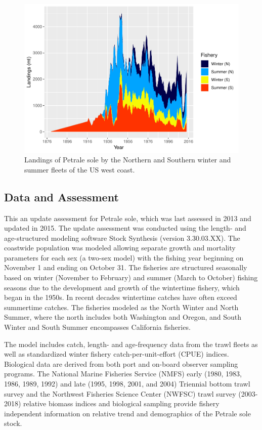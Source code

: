 \documentclass[12pt,]{article}
\begin{document}
\FloatBarrier

\begin{figure}
\centering
\includegraphics{Petrale_2019_Update_files/figure-latex/unnamed-chunk-13-1.pdf}
\caption{Landings of Petrale sole by the Northern and Southern winter
and summer fleets of the US west coast. \label{fig:Exec_catch1}}
\end{figure}

\FloatBarrier

\subsection*{Data and Assessment}\label{data-and-assessment}

This an update assessment for Petrale sole, which was last assessed in
2013 and updated in 2015. The update assessment was conducted using the
length- and age-structured modeling software Stock Synthesis (version
3.30.03.XX). The coastwide population was modeled allowing separate
growth and mortality parameters for each sex (a two-sex model) with the
fishing year beginning on November 1 and ending on October 31. The
fisheries are structured seasonally based on winter (November to
February) and summer (March to October) fishing seasons due to the
development and growth of the wintertime fishery, which began in the
1950s. In recent decades wintertime catches have often exceed summertime
catches. The fisheries modeled as the North Winter and North Summer,
where the north includes both Washington and Oregon, and South Winter
and South Summer encompasses California fisheries.

The model includes catch, length- and age-frequency data from the trawl
fleets as well as standardized winter fishery catch-per-unit-effort
(CPUE) indices. Biological data are derived from both port and on-board
observer sampling programs. The National Marine Fisheries Service (NMFS)
early (1980, 1983, 1986, 1989, 1992) and late (1995, 1998, 2001, and
2004) Triennial bottom trawl survey and the Northwest Fisheries Science
Center (NWFSC) trawl survey (2003-2018) relative biomass indices and
biological sampling provide fishery independent information on relative
trend and demographics of the Petrale sole stock.
\end{document}
